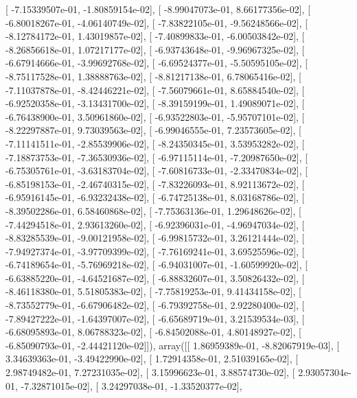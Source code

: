 \documentclass{article}
\begin{document}
       [ -7.15339507e-01,  -1.80859154e-02],
       [ -8.99047073e-01,   8.66177356e-02],
       [ -6.80018267e-01,  -4.06140749e-02],
       [ -7.83822105e-01,  -9.56248566e-02],
       [ -8.12784172e-01,   1.43019857e-02],
       [ -7.40899833e-01,  -6.00503842e-02],
       [ -8.26856618e-01,   1.07217177e-02],
       [ -6.93743648e-01,  -9.96967325e-02],
       [ -6.67914666e-01,  -3.99692768e-02],
       [ -6.69524377e-01,  -5.50595105e-02],
       [ -8.75117528e-01,   1.38888763e-02],
       [ -8.81217138e-01,   6.78065416e-02],
       [ -7.11037878e-01,  -8.42446221e-02],
       [ -7.56079661e-01,   8.65884540e-02],
       [ -6.92520358e-01,  -3.13431700e-02],
       [ -8.39159199e-01,   1.49089071e-02],
       [ -6.76438900e-01,   3.50961860e-02],
       [ -6.93522803e-01,  -5.95707101e-02],
       [ -8.22297887e-01,   9.73039563e-02],
       [ -6.99046555e-01,   7.23573605e-02],
       [ -7.11141511e-01,  -2.85539906e-02],
       [ -8.24350345e-01,   3.53953282e-02],
       [ -7.18873753e-01,  -7.36530936e-02],
       [ -6.97115114e-01,  -7.20987650e-02],
       [ -6.75305761e-01,  -3.63183704e-02],
       [ -7.60816733e-01,  -2.33470834e-02],
       [ -6.85198153e-01,  -2.46740315e-02],
       [ -7.83226093e-01,   8.92113672e-02],
       [ -6.95916145e-01,  -6.93232438e-02],
       [ -6.74725138e-01,   8.03168786e-02],
       [ -8.39502286e-01,   6.58460868e-02],
       [ -7.75363136e-01,   1.29648626e-02],
       [ -7.44294518e-01,   2.93613260e-02],
       [ -6.92396031e-01,  -4.96947034e-02],
       [ -8.83285539e-01,  -9.00121958e-02],
       [ -6.99815732e-01,   3.26121444e-02],
       [ -7.94927374e-01,  -3.97709399e-02],
       [ -7.76169241e-01,   3.69525596e-02],
       [ -6.74189654e-01,  -5.76969218e-02],
       [ -6.94031007e-01,  -1.60599920e-02],
       [ -6.63885220e-01,  -4.64521687e-02],
       [ -6.88832607e-01,   3.50826432e-02],
       [ -8.46118380e-01,   5.51805383e-02],
       [ -7.75819253e-01,   9.41434158e-02],
       [ -8.73552779e-01,  -6.67906482e-02],
       [ -6.79392758e-01,   2.92280400e-02],
       [ -7.89427222e-01,  -1.64397007e-02],
       [ -6.65689719e-01,   3.21539534e-03],
       [ -6.68095893e-01,   8.06788323e-02],
       [ -6.84502088e-01,   4.80148927e-02],
       [ -6.85090793e-01,  -2.44421120e-02]]), array([[  1.86959389e-01,  -8.82067919e-03],
       [  3.34639363e-01,  -3.49422990e-02],
       [  1.72914358e-01,   2.51039165e-02],
       [  2.98749482e-01,   7.27231035e-02],
       [  3.15996623e-01,   3.88574730e-02],
       [  2.93057304e-01,  -7.32871015e-02],
       [  3.24297038e-01,  -1.33520377e-02],
\end{document}
